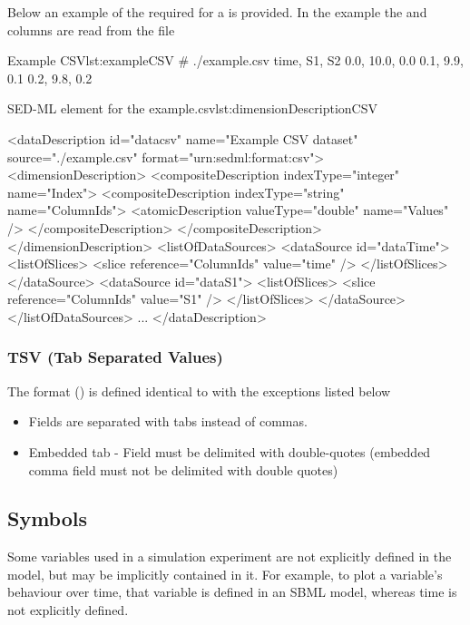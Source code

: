 Below an example of the required \hyperref[sec:dimensionDescription]{} for a  is provided. In the example the  and  columns are read from the  file
\begin{myXmlLst}{Example CSV}{lst:exampleCSV}
# ./example.csv
time, S1, S2
0.0, 10.0, 0.0
0.1, 9.9, 0.1
0.2, 9.8, 0.2
\end{myXmlLst}

\begin{myXmlLst}{SED-ML  element for the example.csv}{lst:dimensionDescriptionCSV}

<dataDescription id="datacsv" name="Example CSV dataset" source="./example.csv" format="urn:sedml:format:csv">
  <dimensionDescription>
    <compositeDescription indexType="integer" name="Index">
      <compositeDescription indexType="string" name="ColumnIds">
        <atomicDescription valueType="double" name="Values" />
      </compositeDescription>
    </compositeDescription>
  </dimensionDescription>
  <listOfDataSources>
    <dataSource id="dataTime">
      <listOfSlices>
        <slice reference="ColumnIds" value="time" />
      </listOfSlices>
    </dataSource>
    <dataSource id="dataS1">
      <listOfSlices>
        <slice reference="ColumnIds" value="S1" />
      </listOfSlices>
    </dataSource>
  </listOfDataSources>
  ...          
</dataDescription>
\end{myXmlLst} 

\subsubsection{TSV (Tab Separated Values)}
\label{sec:dataFormatTSV}
The format  () is defined identical to \hyperref[sec:dataFormatCSV]{} with the exceptions listed below
\begin{itemize}
    \item Fields are separated with tabs instead of commas.
    \item Embedded tab - Field must be delimited with double-quotes (embedded comma field must not be delimited with double quotes)
\end{itemize}


\subsection{Symbols}
\label{sec:implicitVariable}
Some variables used in a simulation experiment are not explicitly defined in the model, but may be implicitly contained in it. For example, to plot a variable's behaviour over time, that variable is defined in an SBML model, whereas time is not explicitly defined. 

